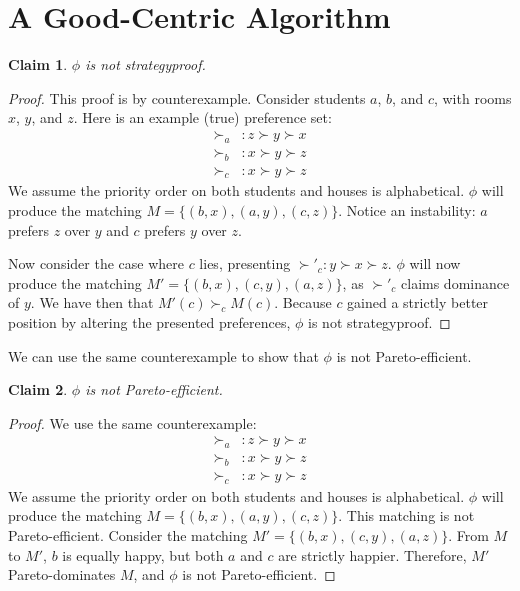 \documentclass[12pt]{article}
\newtheorem{claim}{Claim}
\begin{document}
\section{A Good-Centric Algorithm}

\begin{claim}
$\phi$ is not strategyproof.
\end{claim}
\begin{proof}
This proof is by counterexample. Consider students $a$, $b$, and $c$, with rooms $x$, $y$, and $z$. Here is an example (true) preference set:
\begin{align*}
\succ_a &: z \succ y \succ x\\
\succ_b &: x \succ y \succ z\\
\succ_c &: x \succ y \succ z
\end{align*}
We assume the priority order on both students and houses is alphabetical. $\phi$ will produce the matching $M = \{(b, x), (a, y), (c,z)\}$. Notice an instability: $a$ prefers $z$ over $y$ and $c$ prefers $y$ over $z$.

Now consider the case where $c$ lies, presenting $\succ'_c : y \succ x \succ z$. $\phi$ will now produce the matching $M' = \{(b, x), (c, y), (a,z)\}$, as $\succ'_c$ claims dominance of $y$. We have then that $M'(c) \succ_c M(c)$. Because $c$ gained a strictly better position by altering the presented preferences, $\phi$ is not strategyproof. 
\end{proof}

We can use the same counterexample to show that $\phi$ is not Pareto-efficient.
\begin{claim}
$\phi$ is not Pareto-efficient. 
\end{claim}
\begin{proof}
We use the same counterexample:
\begin{align*}
\succ_a &: z \succ y \succ x\\
\succ_b &: x \succ y \succ z\\
\succ_c &: x \succ y \succ z
\end{align*}
We assume the priority order on both students and houses is alphabetical. $\phi$ will produce the matching $M = \{(b, x), (a, y), (c,z)\}$. This matching is not Pareto-efficient. Consider the matching $M' = \{(b, x), (c, y), (a,z)\}$. From $M$ to $M'$, $b$ is equally happy, but both $a$ and $c$ are strictly happier. Therefore, $M'$ Pareto-dominates $M$, and $\phi$ is not Pareto-efficient.

\end{proof}
\end{document}
